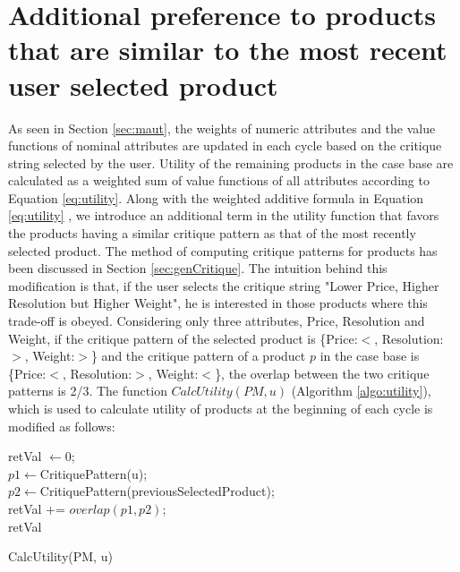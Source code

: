 \section{Additional preference to products that are similar to the most recent user selected product}
As seen in Section \ref{sec:maut}, the weights of numeric attributes and the value functions of nominal attributes are updated in each cycle based on the critique string selected by the user.
Utility of the remaining products in the case base are calculated as a weighted sum of value functions of all attributes according to Equation \ref{eq:utility}.
Along with the weighted additive formula in Equation \ref{eq:utility} , we introduce an additional term in the utility function that favors the products having a similar critique pattern as that of the most recently selected product.
The method of computing critique patterns for products has been discussed in Section \ref{sec:genCritique}.
The intuition behind this modification is that, if the user selects the critique string "Lower Price, Higher Resolution but Higher Weight", he is interested in those products where this trade-off is obeyed.
Considering only three attributes, Price, Resolution and Weight, if the critique pattern of the selected product is \{Price:$<$, Resolution:$>$, Weight:$>$\} and the critique pattern of a product $p$ in the case base is \{Price:$<$, Resolution:$>$, Weight:$<$\}, the overlap between the two critique patterns is 2/3.
The function $CalcUtility(PM, u)$ (Algorithm \ref{algo:utility}), which is used to calculate utility of products at the beginning of each cycle is modified as follows:

\begin{algorithm}[ht]
  \DontPrintSemicolon

  retVal $\gets 0$;\\
  $p1 \gets $CritiquePattern(u);\\
  $p2 \gets $CritiquePattern(previousSelectedProduct);\\
  retVal += $overlap(p1, p2)$;\\
  \Return retVal
  \caption{CalcUtility(PM, u)}
  \label{algo:addPref}
\end{algorithm}




